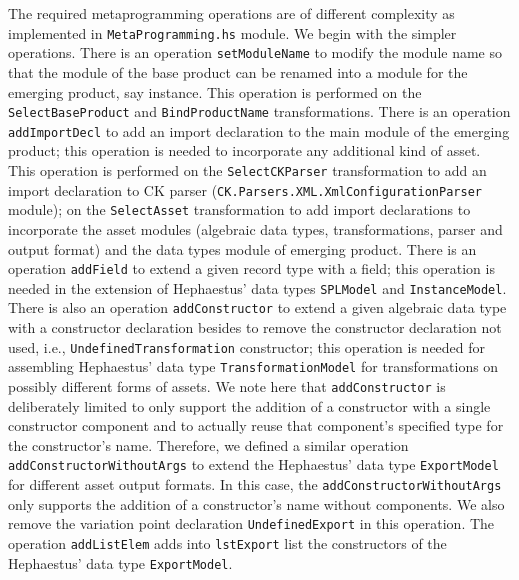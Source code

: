 The required metaprogramming operations are of different complexity as implemented in \texttt{MetaProgramming.hs} module. We begin with the simpler operations. There is an operation \texttt{setModuleName} to modify the module name so that the module of the base product can be renamed into a module for the emerging product, say \hp{} instance. This operation is performed on the \texttt{SelectBaseProduct} and \texttt{BindProductName} transformations.
There is an operation \texttt{addImportDecl} to add an import declaration to the main module of the emerging product; this operation is needed to incorporate any additional kind of asset. This operation is performed on the \texttt{SelectCKParser} transformation to add an import declaration to CK parser (\texttt{CK.Parsers.XML.XmlConfigurationParser} module); on the \texttt{SelectAsset} transformation to add import declarations to incorporate the asset modules (algebraic data types, transformations, parser and output format) and the data types module of emerging product.
There is an operation \texttt{addField} to extend a given record type with a field; this operation is needed in the extension of Hephaestus' data types \texttt{SPLModel} and \texttt{InstanceModel}.
There is also an operation \texttt{addConstructor} to extend a given algebraic data type with a constructor declaration besides to remove the constructor declaration not used, i.e., \texttt{UndefinedTransformation} constructor; this operation is needed for assembling Hephaestus' data type \texttt{TransformationModel} for transformations on possibly different forms of assets. We note here that \texttt{addConstructor} is deliberately limited to only support the addition of a constructor with a single constructor component and to actually reuse that component's specified type for the constructor's name.
Therefore, we defined a similar operation \texttt{addConstructorWithoutArgs} to extend the Hephaestus' data type \texttt{ExportModel} for different asset output formats. In this case, the \texttt{addConstructorWithoutArgs} only supports the addition of a constructor's name without components. We also remove the variation point declaration \texttt{UndefinedExport} in this operation.
The operation \texttt{addListElem} adds into \texttt{lstExport} list the constructors of the Hephaestus' data type \texttt{ExportModel}.

